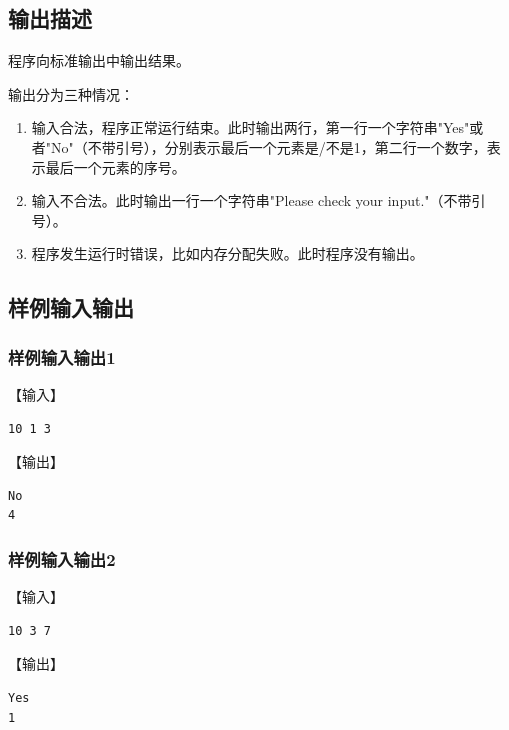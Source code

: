 \documentclass{article}
\begin{document}
\subsection{输出描述}

程序向标准输出中输出结果。

输出分为三种情况：

\begin{enumerate}
    \item 输入合法，程序正常运行结束。此时输出两行，第一行一个字符串"Yes"或者"No"（不带引号），分别表示最后一个元素是/不是1，第二行一个数字，表示最后一个元素的序号。
    \item 输入不合法。此时输出一行一个字符串"Please check your input."（不带引号）。
    \item 程序发生运行时错误，比如内存分配失败。此时程序没有输出。
\end{enumerate}

\subsection{样例输入输出}

\subsubsection{样例输入输出1}

【输入】

\begin{lstlisting}[language={bash},
    basicstyle=\small\consolas]
10 1 3
\end{lstlisting}

【输出】

\begin{lstlisting}[language={bash},
    basicstyle=\small\consolas]
No
4
\end{lstlisting}

\subsubsection{样例输入输出2}

【输入】

\begin{lstlisting}[language={bash},
    basicstyle=\small\consolas]
10 3 7
\end{lstlisting}

【输出】

\begin{lstlisting}[language={bash},
    basicstyle=\small\consolas]
Yes
1
\end{lstlisting}
\end{document}
